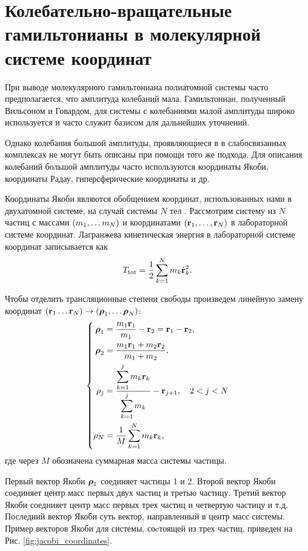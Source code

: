 \section{Колебательно-вращательные гамильтонианы в молекулярной системе координат}

При выводе молекулярного гамильтониана полиатомной системы часто предполагается, что амплитуда колебаний мала. Гамильтониан, полученный Вильсоном и Говардом, для системы с колебаниями малой амплитуды широко используется и часто служит базисом для дальнейших уточнений. \par
Однако колебания большой амплитуды, проявляющиеся в в слабосвязанных комплексах не могут быть описаны при помощи того же подхода. Для описания колебаний большой амплитуды часто используются координаты Якоби, координаты Радау, гиперсферические координаты и др. \par 
Координаты Якоби являются обобщением координат, использованных нами в двухатомной системе, на случай системы $N$ тел \cite{greiner, littlejohn1995}. Рассмотрим систему из $N$ частиц с массами $\left( m_1, \dots m_N \right)$ и координатами $\left( \mathbf{r}_1, \dots, \mathbf{r}_N \right)$ в лабораторной системе координат. Лагранжева кинетическая энергия в лабораторной системе координат записывается как
\begin{gather}
    T_\text{tot} = \frac{1}{2} \sum_{k = 1}^N m_k \dot{\mathbf{r}}_k^2.
\end{gather}

Чтобы отделить трансляционные степени свободы произведем линейную замену координат  $\left( \mathbf{r}_1 \dots \mathbf{r}_N \right) \rightarrow \left( \boldsymbol{\rho}_1, \dots \boldsymbol{\rho}_{N} \right)$: 
\begin{gather}  
    \left\{
    \begin{aligned}
        \boldsymbol{\rho}_1 &= \frac{m_1 \mathbf{r}_1}{m_1} - \mathbf{r}_2 = \mathbf{r}_1 - \mathbf{r}_2, \\
        \boldsymbol{\rho}_2 &= \frac{m_1 \mathbf{r}_1 + m_2 \mathbf{r}_2}{m_1 + m_2}, \\
        \mathbf{\rho}_j &= \frac{\displaystyle \sum_{k = 1}^j m_k \mathbf{r}_k}{\displaystyle \sum_{k = 1}^j m_k} - \mathbf{r}_{j + 1}, \quad 2 < j < N \\
        \mathbf{\rho}_N &= \frac{1}{M} \sum_{k = 1}^N m_k \mathbf{r}_k,
    \end{aligned}
    \right.
\end{gather}
%
где через $M$ обозначена суммарная масса системы частицы. \par
Первый вектор Якоби $\boldsymbol{\rho}_1$ соединяет частицы 1 и 2. Второй вектор Якоби соединяет центр масс первых двух частиц и третью частицу. Третий вектор Якоби соеднияет центр масс первых трех частиц и четвертую частицу и т.д. Последний вектор Якоби суть вектор, направленный в центр масс системы. Пример векторов Якоби для системы, соcтоящей из трех частиц, приведен на Рис. \ref{fig:jacobi_coordinates}. 

